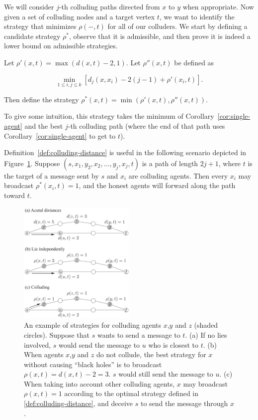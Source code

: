 \documentclass{comnet}
\begin{document}
We will consider $j$-th colluding paths directed from $x$ to $y$ when
appropriate. Now given a set of colluding nodes and a target vertex $t$, we
want to identify the strategy that minimizes $\rho(-,t)$ for all of our
colluders. We start by defining a candidate strategy $\rho^*$, observe that it
is admissible, and then prove it is indeed a lower bound on admissible
strategies.

\begin{definition} \label{def:colluding-distance}
Let $\rho'(x,t) = \max(d(x,t) - 2, 1)$. Let $\rho''(x, t)$ be defined as

\[
   \min_{1 \leq i,j \leq k} \left [ d_j(x,x_i)-2(j-1) + \rho'(x_i, t) \right ].
\]

Then define the strategy $\rho^*(x,t)=\min(\rho'(x,t), \rho''(x, t))$.

\end{definition}

To give some intuition, this strategy takes the minimum of
Corollary~\ref{cor:single-agent} and the best $j$-th colluding path (where the
end of that path uses Corollary~\ref{cor:single-agent} to get to $t$).

Definition~\ref{def:colluding-distance} is useful in the following scenario
depicted in Figure~\ref{fig:colluding-distance}. Suppose $(s, x_1, y_2, x_2,
\dots, y_j, x_j, t)$ is a path of length $2j + 1$, where $t$ is the target of a
message sent by $s$ and $x_i$ are colluding agents.  Then every $x_i$ may
broadcast $\rho^*(x_i, t) = 1$, and 
the honest agents will forward along the path toward $t$.

\begin{figure}[thb]
\centering
\includegraphics[width=0.5\textwidth]{images/strategy}
\caption{An example of strategies for colluding agents $x$,$y$ and $z$ (shaded
circles). Suppose that $s$ wants to send a message to $t$. (a) If no lies
involved, $s$ would send the message to $u$ who is closest to $t$. (b) When
agents $x$,$y$ and $z$ do not collude, the best strategy for $x$ without
causing ``black holes'' is to broadcast $\rho(x,t) = d(x,t) - 2=3$. $s$ would
still send the message to $u$. (c) When taking into account other colluding
agents, $x$ may broadcast $\rho(x,t) = 1$ according to the optimal strategy
defined in \ref{def:colluding-distance}, and deceive $s$ to send the message
through $x$.  } \label{fig:colluding-distance}
\end{figure}
\end{document}
